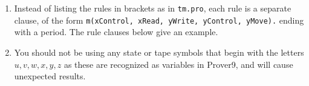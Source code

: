 \documentclass{cs81-homework}
\begin{document}
\begin{enumerate}
\begin{enumerate}[label=\alph*.]
  \item Instead of listing the rules in brackets as in \texttt{tm.pro}, each
    rule is a separate clause, of the form \texttt{m(xControl, xRead, yWrite,
      yControl, yMove).}  ending with a period.  The rule clauses below give an
    example.

  \item You should not be using any state or tape symbols that begin with the
    letters \(u, v, w, x, y, z\) as these are recognized as variables in
    Prover9, and will cause unexpected results.

    
  \end{enumerate}
  
  \begin{solution}
  \end{solution}

\end{enumerate}
\end{document}
